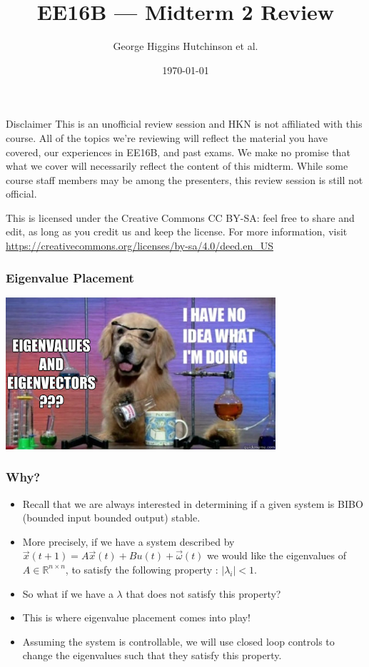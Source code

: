 \documentclass{beamer}
\title{EE16B --- Midterm 2 Review}
\author{George Higgins Hutchinson et al.}
\date{\today}
\newcommand{\R}{\mathbb{R}}
\begin{document}
	\begin{frame}
		\titlepage
	\end{frame}

	\begin{frame}{Disclaimer}
	This is an unofficial review session and HKN is not affiliated with this course. All of the topics we're reviewing will reflect the material you have covered, our experiences in EE16B, and past exams. We make no promise that what we cover will necessarily reflect the content of this midterm. While some course staff members may be among the presenters, this review session is still not official.
	\vspace{1em}
	
	This is licensed under the Creative Commons CC BY-SA: feel free to share and edit, as long as you credit us and keep the license. For more information, visit \\ \small{\url{https://creativecommons.org/licenses/by-sa/4.0/deed.en_US}}
	
	\end{frame}

	\begin{frame}
		\frametitle{Eigenvalue Placement} 
  		\centering\includegraphics[width = 10cm]{eigenvalue.jpg}
	\end{frame}

	\begin{frame}
	\frametitle{Why?} 
		\begin{itemize}
		    \item Recall that we are always interested in determining if a given system is BIBO (bounded input bounded output) stable. 
		    \item More precisely, if we have a system described by $\vec{x}(t+1) = A\vec{x}(t) + Bu(t) + \vec{\omega}(t)$ we would like the eigenvalues of $A \in \R^{n \times n}$, to satisfy the following property : $|\lambda_i| < 1$. 
		    \item So what if we have a $\lambda$ that does not satisfy this property?
		    \item This is where eigenvalue placement comes into play!
		    \item Assuming the system is controllable, we will use closed loop controls to change the eigenvalues such that they satisfy this property. 
		\end{itemize}
	\end{frame}
\end{document}
